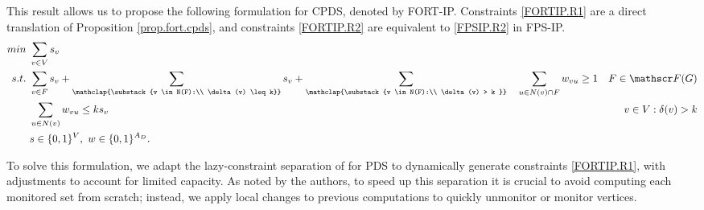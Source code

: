\documentclass{article}
\newcommand{\FORT}{{\mathscr F}}
\newcommand{\FPSIP}{FPS-IP\xspace}
\newcommand{\FORTIP}{FORT-IP\xspace}
\begin{document}
This result allows us to propose the following formulation for CPDS, denoted by \FORTIP. Constraints \eqref{FORTIP.R1} are a direct translation of Proposition \ref{prop.fort.cpds}, and constraints \eqref{FORTIP.R2} are equivalent to \eqref{FPSIP.R2} in \FPSIP.
{\small
\begin{align}
min\  & \sum_{v \in V} s_v \label{FORTIP.ObjFun}\\ 
s.t.\ & \sum_{v \in F} s_v + \sum_{\mathclap{\substack{v \in N(F):\\ \delta(v) \leq k}}} s_v + \sum_{\mathclap{\substack{v \in N(F):\\ \delta(v) > k }}} \hspace{10pt} \sum_{u \in N(v) \cap F} w_{vu} \geq 1 & F \in \FORT(G) \label{FORTIP.R1} \\
& \sum_{u \in N(v)} w_{vu} \leq ks_v & v \in V: \delta(v) > k \label{FORTIP.R2}\\
& s \in \{0,1\}^V,\ w \in \{0,1\}^{A_D}. \span \notag
\end{align}
}

To solve this formulation, we adapt the lazy-constraint separation of \citet{Blasius2024} for PDS to dynamically generate constraints \eqref{FORTIP.R1}, with adjustments to account for limited capacity.
As noted by the authors, to speed up this separation it is crucial to avoid computing each monitored set from scratch; instead, we apply local changes to previous computations to quickly unmonitor or monitor vertices.
\end{document}
